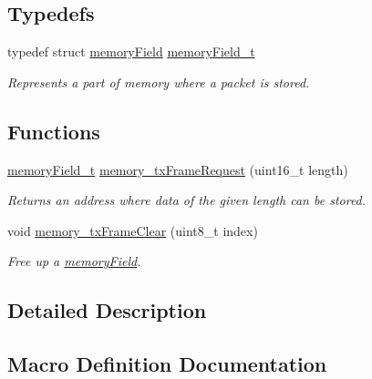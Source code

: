\subsection*{Typedefs}
\begin{DoxyCompactItemize}
\item 
typedef struct \mbox{\hyperlink{structmemory_field}{memory\+Field}} \mbox{\hyperlink{group__memory_ga1d04d80fae40964f55d2df46b5d64785}{memory\+Field\+\_\+t}}
\begin{DoxyCompactList}\small\item\em Represents a part of memory where a packet is stored. \end{DoxyCompactList}\end{DoxyCompactItemize}
\subsection*{Functions}
\begin{DoxyCompactItemize}
\item 
\mbox{\hyperlink{group__memory_ga1d04d80fae40964f55d2df46b5d64785}{memory\+Field\+\_\+t}} \mbox{\hyperlink{group__memory_ga8efe1d17c78d178ef11effad448b1041}{memory\+\_\+tx\+Frame\+Request}} (uint16\+\_\+t length)
\begin{DoxyCompactList}\small\item\em Returns an address where data of the given length can be stored. \end{DoxyCompactList}\item 
void \mbox{\hyperlink{group__memory_ga8b2a265d683cd262c1a0aa1fcb847f75}{memory\+\_\+tx\+Frame\+Clear}} (uint8\+\_\+t index)
\begin{DoxyCompactList}\small\item\em Free up a \mbox{\hyperlink{structmemory_field}{memory\+Field}}. \end{DoxyCompactList}\end{DoxyCompactItemize}


\subsection{Detailed Description}


\subsection{Macro Definition Documentation}
\mbox{\label{group__memory_gad2770fc418de68b3967d98142954405a}} 

